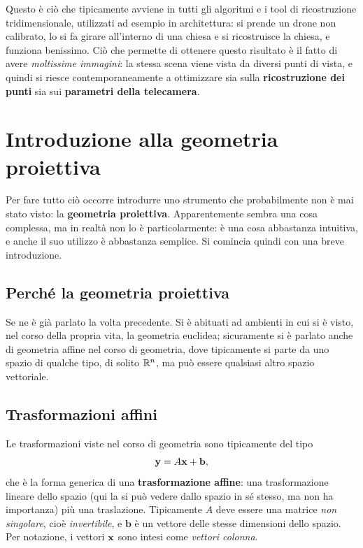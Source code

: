 Questo è ciò che tipicamente avviene in tutti gli algoritmi e i tool di ricostruzione tridimensionale, utilizzati ad esempio in architettura: si prende un drone non calibrato, lo si fa girare all'interno di una chiesa e si ricostruisce la chiesa, e funziona benissimo. Ciò che permette di ottenere questo risultato è il fatto di avere \emph{moltissime immagini}: la stessa scena viene vista da diversi punti di vista, e quindi si riesce contemporaneamente a ottimizzare sia sulla \textbf{ricostruzione dei punti} sia sui \textbf{parametri della telecamera}.

\section{Introduzione alla geometria proiettiva}

Per fare tutto ciò occorre introdurre uno strumento che probabilmente non è mai stato visto: la \textbf{geometria proiettiva}. Apparentemente sembra una cosa complessa, ma in realtà non lo è particolarmente: è una cosa abbastanza intuitiva, e anche il suo utilizzo è abbastanza semplice. Si comincia quindi con una breve introduzione.

\subsection{Perché la geometria proiettiva}

Se ne è già parlato la volta precedente. Si è abituati ad ambienti in cui si è visto, nel corso della propria vita, la geometria euclidea; sicuramente si è parlato anche di geometria affine nel corso di geometria, dove tipicamente si parte da uno spazio di qualche tipo, di solito $\mathbb{R}^n$, ma può essere qualsiasi altro spazio vettoriale.

\subsection{Trasformazioni affini}

Le trasformazioni viste nel corso di geometria sono tipicamente del tipo
\[
  \mathbf{y} = A\mathbf{x} + \mathbf{b},
\]
che è la forma generica di una \textbf{trasformazione affine}: una trasformazione lineare dello spazio (qui la si può vedere dallo spazio in sé stesso, ma non ha importanza) più una traslazione. Tipicamente $A$ deve essere una matrice \emph{non singolare}, cioè \emph{invertibile}, e $\mathbf{b}$ è un vettore delle stesse dimensioni dello spazio. Per notazione, i vettori $\mathbf{x}$ sono intesi come \emph{vettori colonna}.

